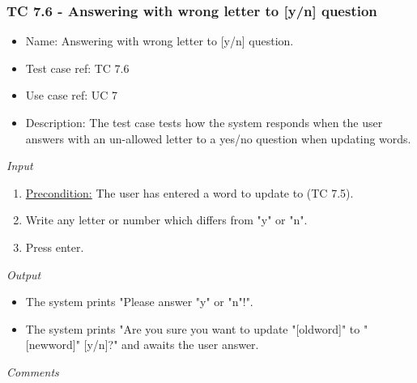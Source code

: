 \documentclass[12pt, letterpaper]{article}
\begin{document}
\subsubsection{TC 7.6 - Answering with wrong letter to [y/n] question}
\begin{itemize}
	\item Name: Answering with wrong letter to [y/n] question.
	\item Test case ref: TC 7.6
	\item Use case ref: UC 7
	\item Description: The test case tests how the system responds when the user answers with an un-allowed letter to a yes/no question when updating words.
\end{itemize}
\emph{Input}
\begin{enumerate}
	\item \underline{Precondition:} The user has entered a word to update to (TC 7.5).
	\item Write any letter or number which differs from "y" or "n".
	\item Press enter.
\end{enumerate}
\emph{Output}
\begin{itemize}
	\item The system prints "Please answer "y" or "n"!".
	\item The system prints "Are you sure you want to update "[oldword]" to "[newword]" [y/n]?" and awaits the user answer.
\end{itemize}
\begin{Form}
	\newline
	\newline
\end{Form}
\newline
\emph{Comments}
\newline
\newline
\newline
\newline
\newline
\newline
\newline
\end{document}
